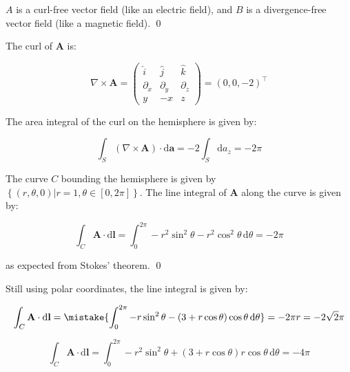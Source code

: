 \documentclass[12pt]{article}
\begin{document}
$A$ is a curl-free vector field (like an electric field), and $B$ is a divergence-free vector field (like a magnetic field).
\qed


The curl of $\mathbf{A}$ is:

\begin{equation}
    \nabla \times \mathbf{A} = 
    \begin{pmatrix}
        \hat{i} & \hat{j} & \hat{k} \\
        \partial_{x} & \partial_{y} & \partial_{z} \\
        y & -x & z
    \end{pmatrix}
    =
    (0, 0, -2)^{\intercal}
\end{equation}

The area integral of the curl on the hemisphere is given by:

\begin{equation}
    \int_{S} (\nabla \times \mathbf{A}) \cdot \mathrm{d}\mathbf{a} = -2\int_{S} \mathrm{d}a_{z} = -2\pi
\end{equation}

The curve $C$ bounding the hemisphere is given by $\left\{ (r, \theta, 0) \vert r = 1, \theta \in [0, 2\pi] \right\}$. The line integral of $\mathbf{A}$ along the curve is given by:

\begin{equation}
    \int_{C} \mathbf{A} \cdot \mathrm{d}\mathbf{l} = \int_{0}^{2\pi} -r^{2} \sin^{2}{\theta} - r^{2} \cos^{2}{\theta} \, \mathrm{d}\theta = -2\pi
\end{equation}

as expected from Stokes' theorem.
\qed


Still using polar coordinates, the line integral is given by:

\begin{equation}
    \int_{C} \mathbf{A} \cdot \mathrm{d}\mathbf{l} = \mistake{\int_{0}^{2\pi} -r \sin^{2}{\theta} - (3 + r\cos{\theta}) \cos{\theta} \, \mathrm{d}\theta} = -2\pi r = -2\sqrt{2} \pi
\end{equation}

\begin{correction}
    \begin{equation}
        \int_{C} \mathbf{A} \cdot \mathrm{d}\mathbf{l} = \int_{0}^{2\pi} -r^{2} \sin^{2}{\theta} + (3 + r\cos{\theta}) r \cos{\theta} \, \mathrm{d}\theta = -4\pi
    \end{equation}
\end{correction}
\end{document}
